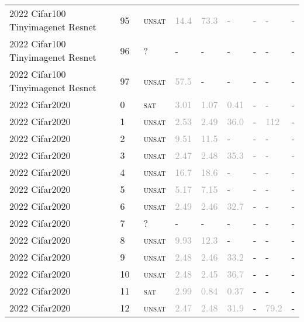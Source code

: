 \begin{center}
{\begin{longtable}{@{}lllllllll@{}}
2022 Cifar100 Tinyimagenet Resnet & 95 & ~\textsc{unsat} & \textcolor{darkgray}{14.4} & \textcolor{darkgray}{73.3} & - & - & - & - \\
2022 Cifar100 Tinyimagenet Resnet & 96 & ~? & - & - & - & - & - & - \\
2022 Cifar100 Tinyimagenet Resnet & 97 & ~\textsc{unsat} & \textcolor{darkgray}{57.5} & - & - & - & - & - \\
\midrule
2022 Cifar2020 & 0 & ~\textsc{sat} & \textcolor{darkgray}{3.01} & \textcolor{darkgray}{1.07} & \textcolor{darkgray}{0.41} & - & - & - \\
2022 Cifar2020 & 1 & ~\textsc{unsat} & \textcolor{darkgray}{2.53} & \textcolor{darkgray}{2.49} & \textcolor{darkgray}{36.0} & - & \textcolor{darkgray}{112} & - \\
2022 Cifar2020 & 2 & ~\textsc{unsat} & \textcolor{darkgray}{9.51} & \textcolor{darkgray}{11.5} & - & - & - & - \\
2022 Cifar2020 & 3 & ~\textsc{unsat} & \textcolor{darkgray}{2.47} & \textcolor{darkgray}{2.48} & \textcolor{darkgray}{35.3} & - & - & - \\
2022 Cifar2020 & 4 & ~\textsc{unsat} & \textcolor{darkgray}{16.7} & \textcolor{darkgray}{18.6} & - & - & - & - \\
2022 Cifar2020 & 5 & ~\textsc{unsat} & \textcolor{darkgray}{5.17} & \textcolor{darkgray}{7.15} & - & - & - & - \\
2022 Cifar2020 & 6 & ~\textsc{unsat} & \textcolor{darkgray}{2.49} & \textcolor{darkgray}{2.46} & \textcolor{darkgray}{32.7} & - & - & - \\
2022 Cifar2020 & 7 & ~? & - & - & - & - & - & - \\
2022 Cifar2020 & 8 & ~\textsc{unsat} & \textcolor{darkgray}{9.93} & \textcolor{darkgray}{12.3} & - & - & - & - \\
2022 Cifar2020 & 9 & ~\textsc{unsat} & \textcolor{darkgray}{2.48} & \textcolor{darkgray}{2.46} & \textcolor{darkgray}{33.2} & - & - & - \\
2022 Cifar2020 & 10 & ~\textsc{unsat} & \textcolor{darkgray}{2.48} & \textcolor{darkgray}{2.45} & \textcolor{darkgray}{36.7} & - & - & - \\
2022 Cifar2020 & 11 & ~\textsc{sat} & \textcolor{darkgray}{2.99} & \textcolor{darkgray}{0.84} & \textcolor{darkgray}{0.37} & - & - & - \\
2022 Cifar2020 & 12 & ~\textsc{unsat} & \textcolor{darkgray}{2.47} & \textcolor{darkgray}{2.48} & \textcolor{darkgray}{31.9} & - & \textcolor{darkgray}{79.2} & - \\

\end{longtable}}
\end{center}
